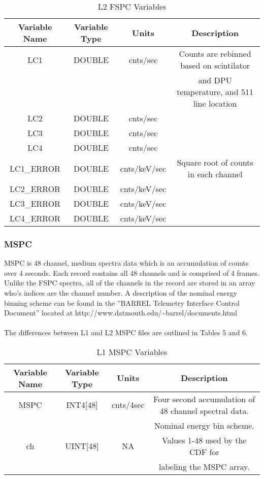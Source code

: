\documentclass{article}
\begin{document}
\begin{table}[H]
\caption{L2 FSPC Variables}
\begin{tabular}{|c|c|c|c|}
\hline
Variable Name&Variable Type&Units&Description\\ \hline
LC1&DOUBLE&cnts/sec&Counts are rebinned based on scintilator\\
~&~&~&and DPU temperature, and 511 line location \\
LC2&DOUBLE&cnts/sec &  ~\\ 
LC3&DOUBLE&cnts/sec & ~\\ 
LC4&DOUBLE&cnts/sec & ~\\
LC1\_ERROR&DOUBLE&cnts/keV/sec&Square root of counts in each channel\\ 
LC2\_ERROR&DOUBLE&cnts/keV/sec&~\\ 
LC3\_ERROR&DOUBLE&cnts/keV/sec&~\\ 
LC4\_ERROR&DOUBLE&cnts/keV/sec&~\\
\hline
\end{tabular}
\end{table}

\subsubsection{MSPC}
MSPC is 48 channel, medium spectra data which is an accumulation of counts over 4 seconds. Each record contains all 48 channels and is comprised of 4 frames. Unlike the FSPC spectra, all of the channels in the record are stored in an array who's indices are the channel number. A description of the nominal energy binning scheme can be found  in the ''BARREL Telemetry Interface Control Document'' located at http://www.datmouth.edu/\~{}barrel/documents.html\\\\
The differences between L1 and L2 MSPC files are outlined in Tables 5 and 6.

\begin{table}[H]
\caption{L1 MSPC Variables}
\begin{tabular}{|c|c|c|c|}
\hline
Variable Name&Variable Type&Units&Description\\ \hline
MSPC&INT4[48]&cnts/4sec&Four second accumulation of 48 channel spectral data.\\
~&~&~&Nominal energy bin scheme.\\ 
ch&UINT[48]&NA&Values 1-48 used by the CDF for\\
~&~&~&labeling the MSPC array.\\
\hline
\end{tabular}
\end{table}
\end{document}
